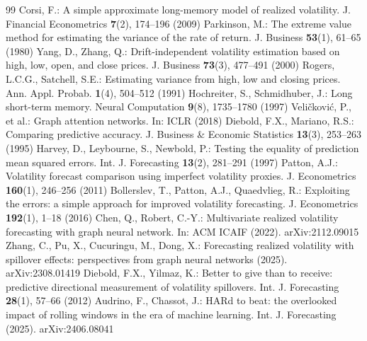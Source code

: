 \documentclass[runningheads]{llncs}
\begin{document}
\begin{thebibliography}{99}
 Corsi, F.: A simple approximate long-memory model of realized volatility. J. Financial Econometrics \textbf{7}(2), 174--196 (2009)
 Parkinson, M.: The extreme value method for estimating the variance of the rate of return. J. Business \textbf{53}(1), 61--65 (1980)
 Yang, D., Zhang, Q.: Drift-independent volatility estimation based on high, low, open, and close prices. J. Business \textbf{73}(3), 477--491 (2000)
 Rogers, L.C.G., Satchell, S.E.: Estimating variance from high, low and closing prices. Ann. Appl. Probab. \textbf{1}(4), 504--512 (1991)
 Hochreiter, S., Schmidhuber, J.: Long short-term memory. Neural Computation \textbf{9}(8), 1735--1780 (1997)
 Veli\v{c}kovi\'c, P., et al.: Graph attention networks. In: ICLR (2018)
 Diebold, F.X., Mariano, R.S.: Comparing predictive accuracy. J. Business \& Economic Statistics \textbf{13}(3), 253--263 (1995)
 Harvey, D., Leybourne, S., Newbold, P.: Testing the equality of prediction mean squared errors. Int. J. Forecasting \textbf{13}(2), 281--291 (1997)
 Patton, A.J.: Volatility forecast comparison using imperfect volatility proxies. J. Econometrics \textbf{160}(1), 246--256 (2011)
 Bollerslev, T., Patton, A.J., Quaedvlieg, R.: Exploiting the errors: a simple approach for improved volatility forecasting. J. Econometrics \textbf{192}(1), 1--18 (2016)
 Chen, Q., Robert, C.-Y.: Multivariate realized volatility forecasting with graph neural network. In: ACM ICAIF (2022). arXiv:2112.09015
 Zhang, C., Pu, X., Cucuringu, M., Dong, X.: Forecasting realized volatility with spillover effects: perspectives from graph neural networks (2025). arXiv:2308.01419
 Diebold, F.X., Yilmaz, K.: Better to give than to receive: predictive directional measurement of volatility spillovers. Int. J. Forecasting \textbf{28}(1), 57--66 (2012)
 Audrino, F., Chassot, J.: HARd to beat: the overlooked impact of rolling windows in the era of machine learning. Int. J. Forecasting (2025). arXiv:2406.08041
\end{thebibliography}
\end{document}
